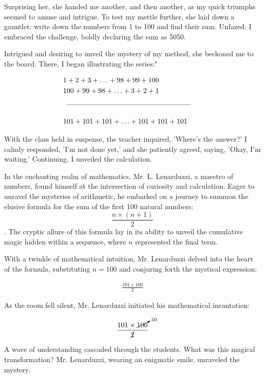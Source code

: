 \documentclass[12pt,a4paper]{article}
\begin{document}
Surprising her, she handed me another, and then another, as my quick triumphs seemed to amuse and intrigue. To test my mettle further, she laid down a gauntlet: write down the numbers from 1 to 100 and find their sum. Unfazed, I embraced the challenge, boldly declaring the sum as 5050.

Intrigued and desiring to unveil the mystery of my method, she beckoned me to the board. There, I began illustrating the series:"

\begin{center}
    \begin{align*}
        &1+2+3+\ldots+98+99+100 \\
        &100+99+98+\ldots+3+2+1 \\
        \cmidrule(lr){1-4} &&&& \\[-1.5ex]
        &101+101+101+\ldots+101+101+101
    \end{align*}
\end{center}


With the class held in suspense, the teacher inquired, 'Where's the answer?' I calmly responded, 'I'm not done yet,' and she patiently agreed, saying, 'Okay, I'm waiting.' Continuing, I unveiled the calculation.

In the enchanting realm of mathematics, Mr. L. Lenarduzzi, a maestro of numbers, found himself at the intersection of curiosity and calculation. Eager to unravel the mysteries of arithmetic, he embarked on a journey to summon the elusive formula for the sum of the first 100 natural numbers: 
\[\frac{n \times (n+1)}{2}\]. The cryptic allure of this formula lay in its ability to unveil the cumulative magic hidden within a sequence, where \(n\) represented the final term.

With a twinkle of mathematical intuition, Mr. Lenarduzzi delved into the heart of the formula, substituting \(n = 100\) and conjuring forth the mystical expression:

\begin{align*}
    \frac{101 \times 100}{2}
\end{align*}

As the room fell silent, Mr. Lenarduzzi initiated his mathematical incantation:

\begin{align*}
    \frac{101 \times \cancelto{50}{100}}{\cancel{2}}
\end{align*}

A wave of understanding cascaded through the students. What was this magical transformation? Mr. Lenarduzzi, wearing an enigmatic smile, unraveled the mystery.
\end{document}
